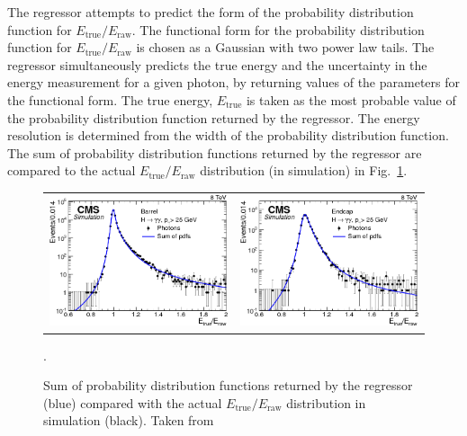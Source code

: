 The regressor attempts to predict the form of the probability distribution function for $E_{\text{true}}/E_{\text{raw}}$.
The functional form for the probability distribution function for $E_{\text{true}}/E_{\text{raw}}$ is chosen as a Gaussian with two power law tails.
The regressor simultaneously predicts the true energy and the uncertainty in the energy measurement for a given photon, by returning values of the parameters for the functional form.
The true energy, $E_{\text{true}}$ is taken as the most probable value of the probability distribution function returned by the regressor.
The energy resolution is determined from the width of the probability distribution function. 
The sum of probability distribution functions returned by the regressor are compared to the actual $E_{\text{true}}/E_{\text{raw}}$ distribution (in simulation) in Fig.~\ref{fig:photon_energy_regression}.
\begin{figure} [h!]
    \centering 
    \begin{tabular}{c c}
        \includegraphics[width=0.48\linewidth]{figures/event_reconstruction_and_selection/figs_recoenergy_Fig-2a.png} &
        \includegraphics[width=0.48\linewidth]{figures/event_reconstruction_and_selection/figs_recoenergy_Fig-2b.png}
    \end{tabular}
    \caption{Sum of probability distribution functions returned by the regressor (blue) compared with the actual $E_{\text{true}}/E_{\text{raw}}$ distribution in simulation (black). Taken from~\cite{Khachatryan:2015iwa}}.
    \label{fig:photon_energy_regression}
\end{figure}

